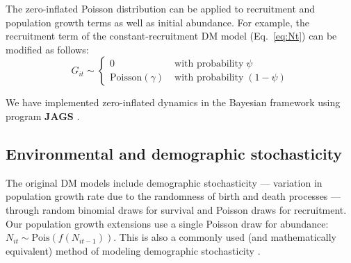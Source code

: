 \documentclass[12pt]{article}
\begin{document}

The zero-inflated Poisson distribution can be applied to recruitment and 
population growth terms as well as initial abundance. For example, 
the recruitment term of the constant-recruitment DM model
(Eq.~\ref{eq:Nt}) can be modified as follows:
\begin{equation}
G_{it} \sim \left\{
\begin{aligned}
0 &\; \text{with probability} \; \psi \\
\mathrm{Poisson}(\gamma) &\; \text{with probability} \; (1-\psi)\end{aligned} \right.
\label{eq:ZIPts}
\end{equation}

We have implemented
zero-inflated dynamics in the Bayesian framework using program
\textbf{JAGS} \citep[version 3.2.0]{plummer:2003}.


\subsection{Environmental and demographic stochasticity}

The original DM models include demographic stochasticity --- variation in population growth 
rate due to the randomness of birth and death processes --- through random 
binomial draws for survival and Poisson draws for recruitment.  Our population
growth extensions use a single Poisson draw for abundance: $N_{it} \sim 
\text{Pois}(f(N_{it-1}))$.  This is also a commonly used (and mathematically equivalent) 
method of modeling demographic stochasticity 
\citep{bonsall_hastings:2004,melbourne_hastings:2008}.  
\end{document}

